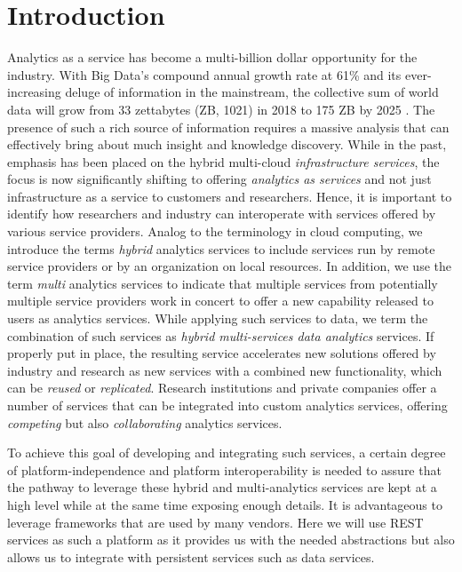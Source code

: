 
\section{Introduction}
\label{sec:summary}


Analytics as a service has become a multi-billion dollar opportunity for the industry. With Big Data's compound annual growth rate at 61\% and its ever-increasing deluge of information in the
mainstream, the collective sum of world data will grow from 33
zettabytes (ZB, 1021) in 2018 to 175 ZB by 2025 \cite{www-idc-forecast}.
The presence of such a rich source
of information requires a massive analysis that can effectively bring
about much insight and knowledge discovery. While in the past, emphasis has been placed on the hybrid multi-cloud {\em infrastructure
services}, the focus is now significantly shifting to offering {\em
analytics as services} and not just infrastructure as a service to
customers and researchers. Hence, it is important to identify how
researchers and industry can interoperate with services offered by
various service providers. Analog to the terminology in cloud
computing, we introduce the terms {\em hybrid} analytics services to
include services run by remote service providers or by an organization
on local resources. In addition, we use the term {\em multi}
analytics services to indicate that multiple services from potentially
multiple service providers work in concert to offer a new capability
released to users as analytics services. While applying such services
to data, we term the combination of such services as {\em hybrid
multi-services data analytics} services. If properly put in place, the
resulting service accelerates new solutions offered by industry and
research as new services with a combined new functionality, which can
be {\em reused} or {\em replicated}. Research institutions and private
companies offer a number of services that can be integrated into
custom analytics services, offering {\em competing} but also {\em
collaborating} analytics services.

To achieve this goal of developing and integrating such services, a certain degree of platform-independence and
platform interoperability is needed to assure that the pathway to
leverage these hybrid and multi-analytics services are kept at a high
level while at the same time exposing enough details. 
It is advantageous to leverage frameworks that are used by many vendors. Here
we will use REST services as such a platform as it provides us with
the needed abstractions but also allows us to integrate with persistent services such as data services.

